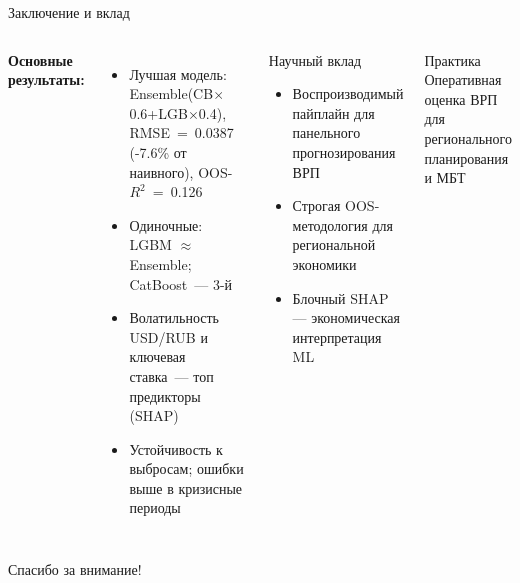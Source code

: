\documentclass[aspectratio=169,10pt]{beamer}
\begin{document}
\begin{frame}{Заключение и вклад}
\begin{columns}[T]
\textbf{Основные результаты:}
\begin{itemize}\setlength\itemsep{4pt}\small
  \item Лучшая модель: Ensemble(CB$\times$0.6+LGB$\times$0.4),
        RMSE~=~0.0387 (-7.6\% от наивного), OOS-$R^2$~=~0.126
  \item Одиночные: LGBM $\approx$ Ensemble; CatBoost~--- 3-й
  \item Волатильность USD/RUB и ключевая ставка~--- топ предикторы (SHAP)
  \item Устойчивость к выбросам; ошибки выше в кризисные периоды
\end{itemize}
\begin{block}{Научный вклад}
\begin{itemize}\setlength\itemsep{3pt}\small
  \item Воспроизводимый пайплайн для панельного прогнозирования ВРП
  \item Строгая OOS-методология для региональной экономики
  \item Блочный SHAP — экономическая интерпретация ML
\end{itemize}
\end{block}
\smallskip
\begin{alertblock}{Практика}
\small Оперативная оценка ВРП для регионального планирования и МБТ
\end{alertblock}
\end{columns}
\medskip
\centering
\textcolor{hseblue}{\large Спасибо за внимание!}
\end{frame}
\end{document}
